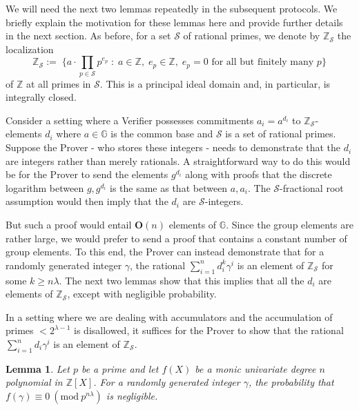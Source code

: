 \documentclass[11pt, lettersize, notitlepage, leqno, footskip=0.6cm]{article}
\newcommand{\bz}{\mathbb Z}
\newcommand{\pl}{\prod\limits}
\newcommand{\slim}{\sum\limits}
\newcommand{\bG}{\mathbb{G}}
\newcommand{\mc}{\mathcal}
\newcommand{\mb}{\mathbb}
\newcommand{\mbf}{\mathbf}
\newcommand{\lam}{\lambda}
\newcommand{\bzs}{\bz_{\mc{S}}}
\newcommand{\bzS}{\bz_{\mc{S}}}
\newcommand{\bO}{\mbf{O}}
\newcommand{\vs}{\vspace{-0.15cm}}
\newcommand{\Mod}[1]{\ (\mathrm{mod}\ #1)}
\newtheorem{Lem}[Thm]{Lemma}
\numberwithin{equation}{section}
\begin{document}
We will need the next two lemmas repeatedly in the subsequent protocols. We briefly explain the motivation for these lemmas here and provide further details in the next section. As before, for a set $\mc{S}$ of rational primes, we denote by $\bz_{\mc{S}}$ the localization \vs $$\bz_{\mc{S}}:= \;\Big\{a\cdot\pl_{p\in \mc{S}} p^{e_p}\;:\;a\in\bz,\; e_p\in \bz,\;e_p = 0 \text{ for all but finitely many } p\Big\}  $$ of $\bz$ at all primes in $\mc{S}$. This is a principal ideal domain and, in particular, is integrally closed. 

Consider a setting where a Verifier possesses commitments $a_i = a^{d_i} $ to $\bz_{\mc{S}}$-elements $d_i$ where $a\in\bG$ is the common base and $\mc{S}$ is a set of rational primes. Suppose the Prover - who stores these integers - needs to demonstrate that the $d_i$ are integers rather than merely rationals. A straightforward way to do this would be for the Prover to send the elements $g^{d_i}$ along with proofs that the discrete logarithm between $g, g^{d_i}$ is the same as that between $a, a_i$. The $\mc{S}$-fractional root assumption would then imply that the $d_i$ are $\mc{S}$-integers. 

But such a proof would entail $\bO(n)$ elements of $\mb{G}$. Since the group elements are rather large, we would prefer to send a proof that contains a constant number of group elements. To this end, the Prover can instead demonstrate that for a randomly generated integer $\gamma$, the rational $\slim_{i=1}^n d_i^{k}\gamma^i$ is an element of $\bzS$ for some $k \geq n\lam$. The next two lemmas show that this implies that all the $d_i$ are elements of $\bzs$, except with negligible probability. 

In a setting where we are dealing with accumulators and the accumulation of primes $< 2^{\lam-1}$ is disallowed, it suffices for the Prover to show that the rational $\sum_{i=1}^n d_i{\gamma^i}$ is an element of $\bzs$. 

\begin{Lem}\label{ram} Let $p$ be a prime and let $f(X)$ be a monic univariate degree $n$ polynomial in $\bz[X]$. For a randomly generated integer $\gamma$, the probability that $f(\gamma)\equiv 0\Mod{p^{n\lam}}$ is negligible. \end{Lem}
\end{document}
